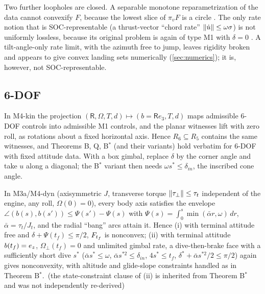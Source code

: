 Two further loopholes are closed. A separable monotone reparametrization of the data cannot convexify $F$, because the
lowest slice of $\pi_v F$ is a circle . The only rate notion that is
SOC-representable (a thrust-vector ``chord rate'' $\lVert \dot u\rVert\le\omega\sigma$) is not uniformly lossless, because its
original problem is again of type M1 with $\delta=0$ . A tilt-angle-only rate limit, with
the azimuth free to jump, leaves rigidity broken and appears to give convex landing sets numerically (\cref{sec:numerics});
it is, however, not SOC-representable.

\subsection{6-DOF}\label{sec:6dof}
\begin{theorem}\label{thm:6kin}
In M4-kin the projection $(\mathsf R,\Omega,T,d)\mapsto(b=\mathsf Re_3,T,d)$ maps admissible 6-DOF controls into admissible M1
controls, and the planar witnesses lift with zero roll, as rotations about a fixed horizontal axis. Hence
$R_6\subseteq R_5$ contains the same witnesses, and Theorems B, Q, B$^*$ (and their variants) hold verbatim for 6-DOF with
fixed attitude data. With a box gimbal, replace $\delta$ by the corner angle and take $u$ along a diagonal; the B$^*$ variant then
needs $\omega s^*\le\delta_{in}$, the inscribed cone angle.\Sproved\ 
\end{theorem}
\begin{theorem}\label{thm:6dyn}
In M3a/M4-dyn (axisymmetric $J$, transverse torque $\lVert \tau_\perp\rVert\le\tau_t$ independent of the engine, any roll, $\Omega(0)=0$),
every body axis satisfies the envelope $\angle(b(s),b(s'))\le\Psi(s')-\Psi(s)$ with $\Psi(s)=\int_0^s\min(\bar\alpha r,\omega)\,dr$,
$\bar\alpha=\tau_t/J_t$, and the radial ``bang'' arcs attain it. Hence (i) with terminal attitude free and
$\delta+\Psi(t_f)\le\pi/2$, $F_{t_f}$ is nonconvex; (ii) with terminal attitude $b(t_f)=e_z$, $\Omega_\perp(t_f)=0$ and unlimited gimbal
rate, a dive-then-brake face with a sufficiently short dive $s^*$ ($\bar\alpha s^*\le\omega$, $\bar\alpha s^{*2}\le\delta_{in}$, $4s^*\le t_f$,
$\delta^*+\bar\alpha s^{*2}/2\le\pi/2$) again gives nonconvexity, with altitude and glide-slope constraints handled as in
Theorem B$^*$.\Sproved\ (the state-constraint clause of (ii) is inherited from Theorem B$^*$ and was not independently re-derived)
\end{theorem}
